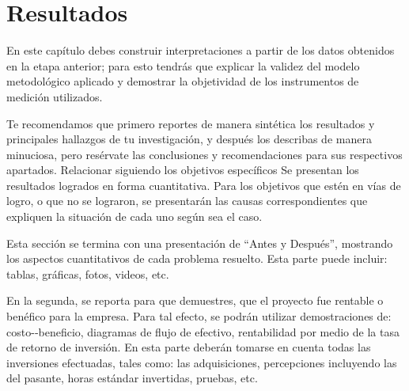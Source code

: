 \chapter*{Resultados}
\label{Resultados}

\noindent \textcolor[rgb]{0,0,1}{
	En este capítulo debes construir interpretaciones a partir de los datos obtenidos en la etapa anterior; para esto tendrás que explicar la validez del modelo metodológico aplicado y demostrar la objetividad de los instrumentos de medición utilizados.}

\noindent \textcolor[rgb]{0,0,1}{
	Te recomendamos que primero reportes de manera sintética los resultados y principales hallazgos de tu investigación, y después los describas de manera minuciosa, pero resérvate las conclusiones y recomendaciones para sus respectivos apartados. Relacionar siguiendo los objetivos específicos Se presentan los resultados logrados en forma cuantitativa. Para los objetivos que estén en vías de logro, o que no se lograron, se presentarán las causas correspondientes que expliquen la situación de cada uno según sea el caso.}

\noindent \textcolor[rgb]{0,0,1}{
	Esta sección se termina con una presentación de “Antes y Después”, mostrando los aspectos cuantitativos de cada problema resuelto. Esta parte puede incluir: tablas, gráficas, fotos, videos, etc.}\newpage

\noindent \textcolor[rgb]{0,0,1}{
	En la segunda, se reporta para que demuestres, que el proyecto fue rentable o benéfico para la empresa. Para tal efecto, se podrán utilizar demostraciones de: costo-­‐beneficio, diagramas de flujo de efectivo, rentabilidad por medio de la tasa de retorno de inversión. En esta parte deberán tomarse en cuenta todas las inversiones efectuadas, tales como: las adquisiciones, percepciones incluyendo las del pasante, horas estándar invertidas, pruebas, etc.}
